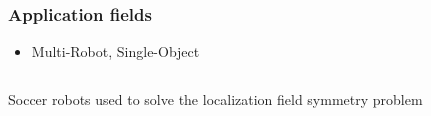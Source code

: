 \begin{frame}
	\frametitle{Application fields}
	
	\vspace{0.24cm}
	
	\begin{itemize}
		\item Multi-Robot, Single-Object
	\end{itemize}
	
	\vspace{-0.45cm}
	
	\begin{columns}[t]
		{
			
			\begin{block}{Soccer robots}
				used to solve the localization field symmetry problem
			\end{block}
			
		}
	\end{columns}
	
	\centering
	\vspace{0.3cm}
	
	
\end{frame}

